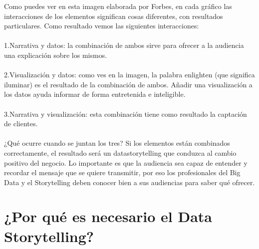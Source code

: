 \item{
Como puedes ver en esta imagen elaborada por Forbes, en cada gráfico las interacciones de los elementos significan cosas diferentes, con resultados particulares. Como resultado vemos las siguientes interacciones:
\\\\1.Narrativa y datos: la combinación de ambos sirve para ofrecer a la audiencia una explicación sobre los mismos.
\\\\2.Visualización y datos: como ves en la imagen, la palabra enlighten (que significa iluminar) es el resultado de la combinación de ambos. Añadir una visualización a los datos ayuda informar de forma entretenida e inteligible.
\\\\3.Narrativa y visualización: esta combinación tiene como resultado la captación de clientes.
\\\\¿Qué ocurre cuando se juntan los tres? Si los elementos están combinados correctamente, el resultado será un datastorytelling que conduzca al cambio positivo del negocio. Lo importante es que la audiencia sea capaz de entender y recordar el mensaje que se quiere transmitir, por eso los profesionales del Big Data y el Storytelling deben conocer bien a sus audiencias para saber qué ofrecer.
}
\section{¿Por qué es necesario el Data Storytelling?}

